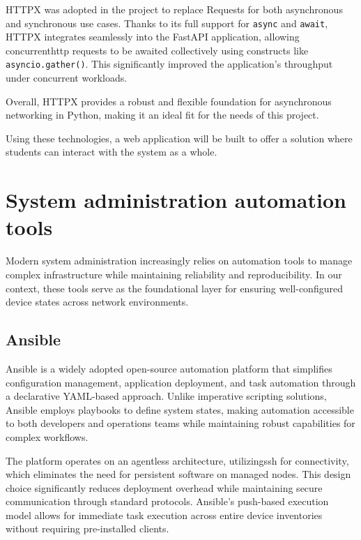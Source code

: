       HTTPX was adopted in the project to replace Requests for both asynchronous and synchronous use cases. Thanks to its full 
      support for \texttt{async} and \texttt{await}, HTTPX integrates seamlessly into the FastAPI application, allowing 
      concurrent\ac{http} requests to be awaited collectively using constructs like \texttt{asyncio.gather()}. This significantly 
      improved the application's throughput under concurrent workloads.

      Overall, HTTPX provides a robust and flexible foundation for asynchronous networking in Python, making it an ideal 
      fit for the needs of this project.

  Using these technologies, a web application will be built to offer a solution where students can interact with the system as a whole.

\section{System administration automation tools}

  Modern system administration increasingly relies on automation tools to manage complex infrastructure while maintaining reliability and 
  reproducibility. In our context, these tools serve as the foundational layer for ensuring well-configured device states across network 
  environments.

  \subsection{Ansible}

    Ansible is a widely adopted open-source automation platform that simplifies configuration management, application deployment, 
    and task automation through a declarative YAML-based approach. Unlike imperative scripting solutions, Ansible employs playbooks 
    to define system states, making automation accessible to both developers and operations teams while maintaining robust capabilities 
    for complex workflows.

    The platform operates on an agentless architecture, utilizing\ac{ssh} for connectivity, which eliminates the need for persistent software 
    on managed nodes. This design choice significantly reduces deployment overhead while maintaining secure communication through standard 
    protocols. Ansible's push-based execution model allows for immediate task execution across entire device inventories without requiring 
    pre-installed clients.

